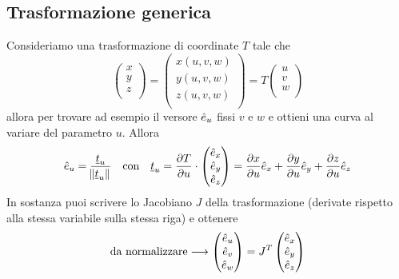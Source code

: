 \documentclass[11pt,landscape,a4paper]{article}
\begin{document}
\begin{multicols}{3}
    \subsection{Trasformazione generica}
        Consideriamo una trasformazione di coordinate $T$ tale che 
        $$ \begin{pmatrix}
            x\\
            y\\
            z\\
        \end{pmatrix}
        = 
        \begin{pmatrix}
            x(u,v,w)\\
            y(u,v,w)\\
            z(u,v,w)\\
        \end{pmatrix}
        = T \begin{pmatrix}
            u\\ v\\ w\\
            \end{pmatrix}
        $$
        allora per trovare ad esempio il versore $\hat{e}_u$ fissi $v$ e $w$ e ottieni una curva al variare del parametro $u$. Allora 
        $$ \hat{e}_u = \frac{\underline{t}_u}{\norm{\underline{t}_u}} \quad \text{con} \quad \underline{t}_u = \frac{\partial T}{\partial u} \cdot \begin{pmatrix} \hat{e}_x\\ \hat{e}_y \\ \hat{e}_z \end{pmatrix} = \frac{\partial x}{\partial u} \hat{e}_x + \frac{\partial y}{\partial u} \hat{e}_y + \frac{\partial z}{\partial u} \hat{e}_z$$
        In sostanza puoi scrivere lo Jacobiano $J$ della trasformazione (derivate rispetto alla stessa variabile sulla stessa riga) e ottenere
        $$ \text{da normalizzare}\longrightarrow \begin{pmatrix}
            \hat{e}_u\\ \hat{e}_v\\ \hat{e}_w
        \end{pmatrix} = J^T
        \begin{pmatrix}
            \hat{e}_x \\\hat{e}_y\\\hat{e}_z
        \end{pmatrix}$$

\end{multicols}
\end{document}

